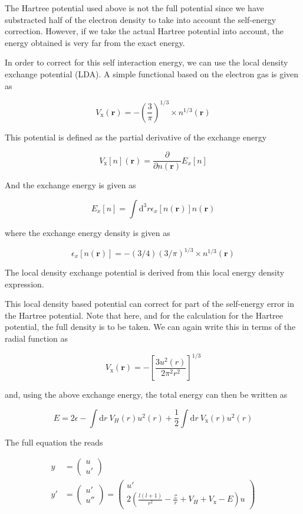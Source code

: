 \documentclass[11pt,a4paper]{article}
\begin{document}
The Hartree potential used above is not the full potential since
we have substracted half of the electron density to take into
account the self-energy correction. However, if we take the
actual Hartree potential into account, the energy obtained is
very far from the exact energy.

In order to correct for this self interaction energy, we can use
the local density exchange potential (LDA). A simple functional
based on the electron gas is given as

\[
V_{\text{x}}(\mathbf{r}) = -\left( \frac{3}{\pi} \right )^{1/3} \times n^{1/3}(\mathbf{r})
\]


This potential is defined as the partial derivative of the exchange energy

\[
V_{\text{x}}[n](\mathbf{r}) = \frac{\partial}{\partial n (\mathbf{r})}E_{x}[n]
\]

And the exchange energy is given as

\[
E_{x}[n] = \int \text{d}^3 r \epsilon_{x}[n(\mathbf{r})]n(\mathbf{r})
\]

where the exchange energy density is given as

\[
\epsilon_{x}[n(\mathbf{r})] = -(3/4)(3/\pi)^{1/3} \times n^{1/3}(\mathbf{r})
\]

The local density exchange potential is derived from this local
energy density expression.

This local density based potential can correct for part of the self-energy error
in the Hartree potential. Note that here, and for the calculation for the
Hartree potential, the full density is to be taken. We can again
write this in terms of the radial function as

\[
V_{\text{x}}(\mathbf{r}) = -\left[ \frac{3u^2(r)}{2\pi^2r^2} \right ]^{1/3}
\]

and, using the above exchange energy, the total energy can then be
written as

\[
E = 2 \epsilon - \int \text{d}r\ V_H(r) u^2(r) + \frac{1}{2}\int \text{d}r\ V_{\text{x}}(r)u^2(r)
\]

The full equation the reads

\begin{align*}
\label{Eq16}
y &= \begin{pmatrix} u \\ u' \end{pmatrix}\\
y' &= \begin{pmatrix} u' \\ u'' \end{pmatrix} = \begin{pmatrix} u' \\ 2\left( \frac{l(l+1)}{r^2} -\frac{\mathcal{Z}}{r} + V_H + V_{\text{x}} - E \right) u \end{pmatrix}\\
\end{align*}
\end{document}
